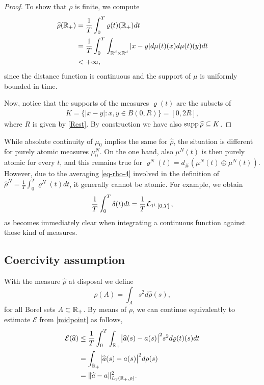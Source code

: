 \begin{proof}
To show that $\rho$ is finite, we compute
\begin{align*}
\begin{split}
\widehat \rho(\mathbb{R}_+)&= \frac{1}{T}\int_0^T \varrho(t)(\mathbb{R}_+)dt \\
&= \frac{1}{T}\int_0^T \int_{\mathbb{R}^d \times \mathbb{R}^d} |x - y| d\mu(t)(x) d \mu(t)(y)dt\\
&<+\infty,
\end{split}
\end{align*}
since the distance function is continuous and the support of $\mu$ is uniformly bounded in time.

	Now, notice that the supports of the measures $\varrho(t)$ are the subsets of
	\begin{align*}
	K=\{|x-y|:x,y\in B(0,R)\} = [0,2R],
	\end{align*}
	where $R$ is given by \eqref{Rest}. By construction we have also
	$\operatorname{supp} \widehat \rho\subseteq K$.
\end{proof}

\begin{remark}
	While absolute continuity of $\mu_0$ implies the same for $\widehat \rho$, the situation is different for purely atomic
	measures $\mu_0^N$. On the one hand, also $\mu^N(t)$ is then purely atomic for every $t$, and this remains true for
	$\varrho^N(t) = d_\# (\mu^N(t) \oplus \mu^N(t))$. However, due to the averaging \eqref{eq-rho-4} involved in the definition of $\widehat \rho^N=\frac{1}{T} \int_0^T \varrho^N(t) dt$, it generally cannot be atomic. For
	example, we obtain
	\begin{align*}
		\frac{1}{T}\int_0^T\delta(t) dt=\frac{1}{T}\mathcal{L}_1\llcorner_{[0,T]}\,,
	\end{align*}
	as becomes immediately clear when integrating a continuous function against those kind of measures.
\end{remark}

\subsection{Coercivity assumption}\label{sec:coerc}

With the measure $\widehat \rho$ at disposal we define
\begin{equation}\label{finallyrho}
\rho(A) = \int_{A} s^2 d\widehat \rho(s),
\end{equation}
for all Borel sets $A \subset \mathbb{R}_+$. By means of $\rho$, we can continue equivalently to  estimate $\mathcal E$ from \eqref{midpoint} as follows,
\begin{align}
\begin{split}\label{eq-rho-3}
	\mathcal E(\widehat a)&\leq\frac{1}{T}\int_0^T\int_{\mathbb{R}_+}\bigl|\widehat a(s)-a(s)\bigr|^2 s^2 d\varrho(t)(s) dt \\
		&= \int_{\mathbb{R}_+} \bigl|\widehat a(s)-a(s)\bigr|^2 d\rho(s)\\
		&= \|\widehat a-a\|^2_{L_2(\mathbb{R}_+,\rho)}.
\end{split}
\end{align}

